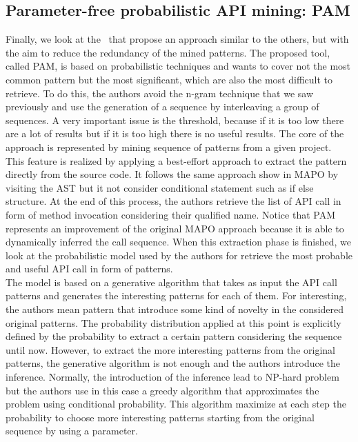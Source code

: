 \subsection{Parameter-free probabilistic API mining: PAM}
Finally, we look at the~\cite{fowkes_parameter-free_2016} that propose an approach similar to the others, but with the aim to reduce the redundancy of the mined patterns. The proposed tool, called PAM, is based on probabilistic techniques and wants to cover not the most common pattern but the most significant, which are also the most difficult to retrieve. To do this, the authors avoid the n-gram technique that we saw previously and use the generation of a sequence by interleaving a group of sequences. A very important issue is the threshold, because if it is too low there are a lot of results but if it is too high there is no useful results. The core of the approach is represented by mining sequence of patterns from a given project. \\
This feature is realized by applying a best-effort approach to extract the pattern directly from the source code. It follows the same approach show in MAPO by visiting the AST but it not consider conditional statement such as if else structure. At the end of this process, the authors retrieve the list of API call in form of method invocation considering their qualified name. Notice that PAM represents an improvement of the original MAPO approach because it is able to dynamically inferred the call sequence. When this extraction phase is finished, we look at the probabilistic model used by the authors for retrieve the most probable and useful API call in form of patterns. \\
The model is based on a generative algorithm that takes as input the API call patterns and generates the interesting patterns for each of them. For interesting, the authors mean pattern that introduce some kind of novelty in the considered original patterns. The probability distribution applied at this point is explicitly defined by the probability to extract a certain pattern considering the sequence until now. However, to extract the more interesting patterns from the original patterns, the generative algorithm is not enough and the authors introduce the inference. Normally, the introduction of the inference lead to NP-hard problem but the authors use in this case a greedy algorithm that approximates the problem using conditional probability. This algorithm maximize at each step the probability to choose more interesting patterns starting from the original sequence by using a parameter. \newline

